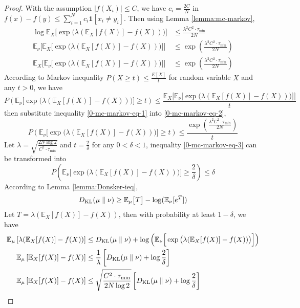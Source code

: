 \begin{proof}
	With the assumption $|f(X_i)| \leq C$, we have $c_i=\frac{2C}{N}$ in $f(x)-f(y)\leq\sum_{i=1}^Nc_i \bm{1}[x_i\neq y_i]$. Then using Lemma \ref{lemma:mc-markov},
	\begin{align}
		\log\mathbb{E}_X\Big[\exp\big(\lambda(\mathbb{E}_X[f(X)]-f(X))\big)\Big]&\leq\frac{\lambda^2C^2\cdot \tau_{\min}}{2N} \nonumber\\
		\mathbb{E}_{\nu}\Big[\mathbb{E}_X\Big[\exp\big(\lambda(\mathbb{E}_X[f(X)]-f(X))\big)\Big]\Big]&\leq\exp\left(\frac{\lambda^2 C^2\cdot \tau_{\min}}{2N}\right) \nonumber\\
		\mathbb{E}_{X}\Big[\mathbb{E}_\nu\Big[\exp\big(\lambda(\mathbb{E}_X[f(X)]-f(X))\big)\Big]\Big]&\leq\exp\left(\frac{\lambda^2 C^2\cdot \tau_{\min}}{2N}\right) \label{0-mc-markov-eq-1}
	\end{align}
	According to Markov inequality $P(X \geq t)\leq \frac{E[X]}{t}$ for random variable $X$ and any $t>0$, we have
	\begin{equation}\label{0-mc-markov-eq-2}
		P{\left(\mathbb{E}_\nu\Big[\exp\big(\lambda(\mathbb{E}_X[f(X)]-f(X))\big)\Big] \geq t \right)}\leq \frac{\mathbb{E}_X\Big[\mathbb{E}_\nu\Big[\exp\big(\lambda(\mathbb{E}_X[f(X)]-f(X))\big)\Big]\Big]}{t} 
	\end{equation}
	then substitute inequality \ref{0-mc-markov-eq-1} into \ref{0-mc-markov-eq-2},
	\begin{equation}\label{0-mc-markov-eq-3}
		P{\left(\mathbb{E}_\nu\Big[\exp\big(\lambda(\mathbb{E}_X[f(X)]-f(X))\big)\Big] \geq t \right)}\leq \frac{\exp\left(\frac{\lambda^2 C^2\cdot \tau_{\min}}{2N}\right)}{t}
	\end{equation}
	Let $\lambda=\sqrt{\frac{2N\log 2}{C^2\cdot \tau_{\min}}}$ and $t=\frac{2}{\delta}$ for any $0 < \delta < 1$, inequality \ref{0-mc-markov-eq-3} can be transformed into
	$$
	P{\left(\mathbb{E}_\nu\Big[\exp\big(\lambda(\mathbb{E}_X[f(X)]-f(X))\big)\Big] \geq \frac{2}{\delta} \right)}\leq \delta
	$$
	According to Lemma \ref{lemma:Donsker-ieq}, 
	$$
	D_{\mathrm{KL}}(\mu\parallel \nu) \geq \mathbb{E}_\mu\big[T\big]-\log(\mathbb{E}_\nu[e^T])
	$$
	Let $T=\lambda(\mathbb{E}_X[f(X)]-f(X))$, then with probability at least $1-\delta$, we have
	$$
	\begin{aligned}
		\mathbb{E}_\mu\left[\lambda(\mathbb{E}_X[f(X)]-f(X))\right] &\leq D_{\mathrm{KL}}(\mu\parallel \nu)+\log\left(\mathbb{E}_\nu\Big[\exp\big(\lambda(\mathbb{E}_X[f(X)]-f(X))\big)\Big]\right) \\
		\mathbb{E}_\mu\left[\mathbb{E}_X[f(X)] -f(X)\right] &\leq \frac{1}{\lambda}\left[D_{\mathrm{KL}}(\mu\parallel \nu)+\log \frac{2}{\delta}\right] \\
		\mathbb{E}_\mu\left[\mathbb{E}_X[f(X)] -f(X)\right] &\leq \sqrt{\frac{C^2\cdot \tau_{\min}}{2N \log 2}}\left[D_{\mathrm{KL}}(\mu\parallel \nu)+\log \frac{2}{\delta}\right]
	\end{aligned}
	$$
\end{proof}

